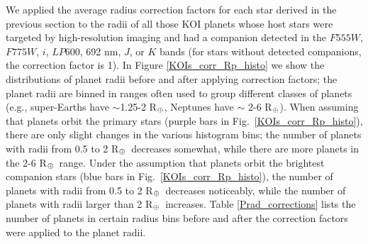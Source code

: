 \documentclass[twocolumn,appendixfloats]{aastex6}
\newcommand{\RE}{R$_{\Earth}$}
\begin{document}
We applied the average radius correction factors for each star derived in the 
previous section to the radii of all those KOI planets whose host stars were 
targeted by high-resolution imaging and had a companion detected in the 
$F555W$, $F775W$, $i$, $LP600$, 692 nm, $J$, or $K$ bands (for stars
without detected companions, the correction factor is 1). In Figure 
\ref{KOIs_corr_Rp_histo} we show the distributions of planet radii before
and after applying correction factors; the planet radii are binned in ranges
often used to group different classes of planets (e.g., super-Earths have
$\sim$1.25-2 \RE, Neptunes have $\sim$ 2-6 \RE). 
When assuming that planets orbit the primary stars (purple bars in Fig.\
\ref{KOIs_corr_Rp_histo}), there are only slight changes in the various 
histogram bins; the number of planets with radii from 0.5 to 2 \RE\ 
decreases somewhat, while there are more planets in the 2-6 \RE\ range. 
Under the assumption that planets orbit the brightest companion stars
(blue bars in Fig.\ \ref{KOIs_corr_Rp_histo}), the number of planets with 
radii from 0.5 to 2 \RE\ decreases noticeably, while the number of planets 
with radii larger than 2 \RE\ increases. Table \ref{Prad_corrections} lists 
the number of planets in certain radius bins before and after the correction 
factors were applied to the planet radii. 
\end{document}
